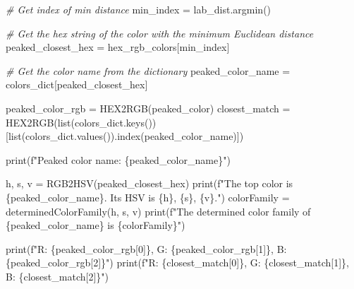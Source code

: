 \documentclass[11pt]{article}
\newenvironment{Shaded}{}{}
\newcommand{\DecValTok}[1]{\textcolor[rgb]{0.25,0.63,0.44}{{#1}}}
\newcommand{\CommentTok}[1]{\textcolor[rgb]{0.38,0.63,0.69}{\textit{{#1}}}}
\newcommand{\NormalTok}[1]{{#1}}
\newcommand{\SpecialCharTok}[1]{\textcolor[rgb]{0.25,0.44,0.63}{{#1}}}
\newcommand{\SpecialStringTok}[1]{\textcolor[rgb]{0.73,0.40,0.53}{{#1}}}
\newcommand{\OperatorTok}[1]{\textcolor[rgb]{0.40,0.40,0.40}{{#1}}}
\newcommand{\BuiltInTok}[1]{{#1}}
\begin{document}
\begin{Shaded}
\begin{Highlighting}[]
    \CommentTok{# Get index of min distance}
\NormalTok{    min_index }\OperatorTok{=}\NormalTok{ lab_dist.argmin()}

    \CommentTok{# Get the hex string of the color with the minimum Euclidean distance }
\NormalTok{    peaked_closest_hex }\OperatorTok{=}\NormalTok{ hex_rgb_colors[min_index]}

    \CommentTok{# Get the color name from the dictionary}
\NormalTok{    peaked_color_name }\OperatorTok{=}\NormalTok{ colors_dict[peaked_closest_hex]}

\NormalTok{    peaked_color_rgb }\OperatorTok{=}\NormalTok{ HEX2RGB(peaked_color)}
\NormalTok{    closest_match }\OperatorTok{=}\NormalTok{ HEX2RGB(}\BuiltInTok{list}\NormalTok{(colors_dict.keys())}
\NormalTok{        [}\BuiltInTok{list}\NormalTok{(colors_dict.values()).index(peaked_color_name)])}

    \BuiltInTok{print}\NormalTok{(}\SpecialStringTok{f"Peaked color name: }\SpecialCharTok{\{}\NormalTok{peaked_color_name}\SpecialCharTok{\}}\SpecialStringTok{"}\NormalTok{)}

\NormalTok{    h, s, v }\OperatorTok{=}\NormalTok{ RGB2HSV(peaked_closest_hex)}
    \BuiltInTok{print}\NormalTok{(}\SpecialStringTok{f"The top color is }\SpecialCharTok{\{}\NormalTok{peaked_color_name}\SpecialCharTok{\}}\SpecialStringTok{. }
\SpecialStringTok{        Its HSV is }\SpecialCharTok{\{h\}}\SpecialStringTok{, }\SpecialCharTok{\{s\}}\SpecialStringTok{, }\SpecialCharTok{\{v\}}\SpecialStringTok{."}\NormalTok{)}
\NormalTok{    colorFamily }\OperatorTok{=}\NormalTok{ determinedColorFamily(h, s, v)}
    \BuiltInTok{print}\NormalTok{(}\SpecialStringTok{f"The determined color family of }
\SpecialStringTok{        }\SpecialCharTok{\{}\NormalTok{peaked_color_name}\SpecialCharTok{\}}\SpecialStringTok{ is }\SpecialCharTok{\{}\NormalTok{colorFamily}\SpecialCharTok{\}}\SpecialStringTok{"}\NormalTok{)}

    \BuiltInTok{print}\NormalTok{(}\SpecialStringTok{f"R: }\SpecialCharTok{\{}\NormalTok{peaked_color_rgb[}\DecValTok{0}\NormalTok{]}\SpecialCharTok{\}}\SpecialStringTok{, G: }
\SpecialStringTok{        }\SpecialCharTok{\{}\NormalTok{peaked_color_rgb[}\DecValTok{1}\NormalTok{]}\SpecialCharTok{\}}\SpecialStringTok{, B: }\SpecialCharTok{\{}\NormalTok{peaked_color_rgb[}\DecValTok{2}\NormalTok{]}\SpecialCharTok{\}}\SpecialStringTok{"}\NormalTok{)}
    \BuiltInTok{print}\NormalTok{(}\SpecialStringTok{f"R: }\SpecialCharTok{\{}\NormalTok{closest_match[}\DecValTok{0}\NormalTok{]}\SpecialCharTok{\}}\SpecialStringTok{, G: }\SpecialCharTok{\{}\NormalTok{closest_match[}\DecValTok{1}\NormalTok{]}\SpecialCharTok{\}}\SpecialStringTok{, }
\SpecialStringTok{        B: }\SpecialCharTok{\{}\NormalTok{closest_match[}\DecValTok{2}\NormalTok{]}\SpecialCharTok{\}}\SpecialStringTok{"}\NormalTok{)}


\end{Highlighting}
\end{Shaded}
\end{document}
